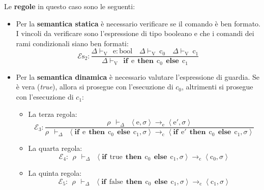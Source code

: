 \documentclass[a4paper]{article}
\begin{document}
 	\noindent
 	Le \textbf{regole} in questo caso sono le seguenti:
 	\begin{itemize}
 		\item Per la \textbf{semantica statica} è necessario verificare se il comando è ben formato. I vincoli da verificare sono l'espressione di tipo booleano e che i comandi dei rami condizionali siano ben formati:
 		\begin{equation*}
 			\mathcal{E}\mathrm{s}_{2} : \dfrac{
 				\Delta\vdash_{\mathrm{V}} \:\: \mathrm{e:bool} \hspace{1em} \Delta\vdash_{\mathrm{V}} \: \mathrm{c}_{0} \hspace{1em} \Delta\vdash_{\mathrm{V}} \: \mathrm{c}_{1}
 			}{
 				\Delta\vdash_{\mathrm{V}} \:\: \mathbf{if} \:\: \mathrm{e} \:\: \mathbf{then} \:\: \mathrm{c}_{0} \:\: \mathbf{else} \:\: \mathrm{c}_{1}
 			}
 		\end{equation*}
 		
 		\item Per la \textbf{semantica dinamica} è necessario valutare l'espressione di guardia. Se è vera (\emph{true}), allora si prosegue con l'esecuzione di $c_{0}$, altrimenti si prosegue con l'esecuzione di $c_{1}$:
 		\begin{itemize}
 			\item La terza regola:
 			\begin{equation*}
 				\mathcal{E}_{3} : \dfrac{
 					\rho \:\: \vdash_{\Delta} \:\: \left\langle \mathrm{e}, \sigma \right\rangle \rightarrow_{\mathrm{e}} \left\langle \mathrm{e}', \sigma \right\rangle
 				}{
 					\rho \:\: \vdash_{\Delta} \:\: \left\langle \mathbf{if} \:\: \mathrm{e} \:\: \mathbf{then} \:\: \mathrm{c}_{0} \:\: \mathbf{else} \:\: \mathrm{c}_{1}, \sigma \right\rangle \rightarrow_{\mathrm{c}} \left\langle \mathbf{if} \:\: \mathrm{e}' \:\: \mathbf{then} \:\: \mathrm{c}_{0} \:\: \mathbf{else} \:\: \mathrm{c}_{1}, \sigma \right\rangle
 				}
 			\end{equation*}
 			
 			\item La quarta regola:
 			\begin{equation*}
 				\mathcal{E}_{4} : \:\: \rho \:\: \vdash_{\Delta} \:\: \left\langle \mathbf{if} \:\: \mathrm{true} \:\: \mathbf{then} \:\: \mathrm{c}_{0} \:\: \mathbf{else} \:\: \mathrm{c}_{1}, \sigma \right\rangle \rightarrow_{\mathrm{c}} \left\langle \mathrm{c}_{0}, \sigma \right\rangle
 			\end{equation*}
 			
 			\item La quinta regola:
 			\begin{equation*}
 				\mathcal{E}_{5} : \:\: \rho \:\: \vdash_{\Delta} \:\: \left\langle \mathbf{if} \:\: \mathrm{false} \:\: \mathbf{then} \:\: \mathrm{c}_{0} \:\: \mathbf{else} \:\: \mathrm{c}_{1}, \sigma \right\rangle \rightarrow_{\mathrm{c}} \left\langle \mathrm{c}_{1}, \sigma \right\rangle
 			\end{equation*}
 		\end{itemize}
 	\end{itemize}\newpage
 	
\end{document}
